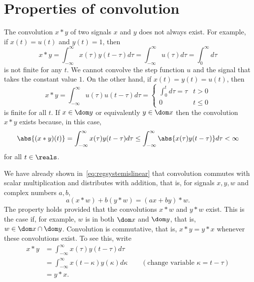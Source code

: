 \section{Properties of convolution}\label{sec:prop-conv}

The convolution $x * y$ of two signals $x$ and $y$ does not always exist.  For example, if $x(t) = u(t)$ and $y(t) = 1$, then
\[
x * y = \int_{-\infty}^\infty x(\tau) y(t - \tau) d\tau = \int_{-\infty}^\infty u(\tau) d\tau = \int_{0}^\infty d\tau
\]
is not finite for any $t$.  We cannot convolve the step function $u$ and the signal that takes the constant value $1$.  On the other hand, if $x(t) = y(t) = u(t)$, then
\[
x * y = \int_{-\infty}^\infty u(\tau) u(t - \tau) d\tau =  \begin{cases}
\int_{0}^t d\tau  = \tau & t > 0 \\
0 & t \leq 0
\end{cases}
\]
is finite for all $t$.  If $x \in \dom y$ or equivalently $y \in \dom x$ then the convolution $x * y$ exists because, in this case,
\[
\abs{(x*y)(t)} = \int_{-\infty}^{\infty} x(\tau) y(t - \tau) d\tau \leq \int_{-\infty}^{\infty} \abs{x(\tau) y(t - \tau)} d\tau < \infty 
\]
for all $t \in \reals$.  

We have already shown in~\eqref{eq:regsystemislinear} that convolution commutes with scalar multiplication and distributes with addition, that is, for signals $x,y,w$ and complex numbers $a,b$,
\[
a (x * w) + b (y * w) = (ax + by) * w.
\]
The property holds provided that the convolutions $x*w$ and $y*w$ exist.  This is the case if, for example, $w$ is in both  $\dom x$ and $\dom y$, that is, $w \in \dom x \cap \dom y$.  Convolution is commutative, that is, $x*y = y*x$ whenever these convolutions exist.  To see this, write
\begin{align*}
x*y &= \int_{-\infty}^\infty x(\tau) y(t - \tau) d\tau \\
&= \int_{-\infty}^\infty x(t - \kappa) y(\kappa) d\kappa \qquad (\text{change variable $\kappa = t - \tau$}) \\
&= y * x.
\end{align*}

